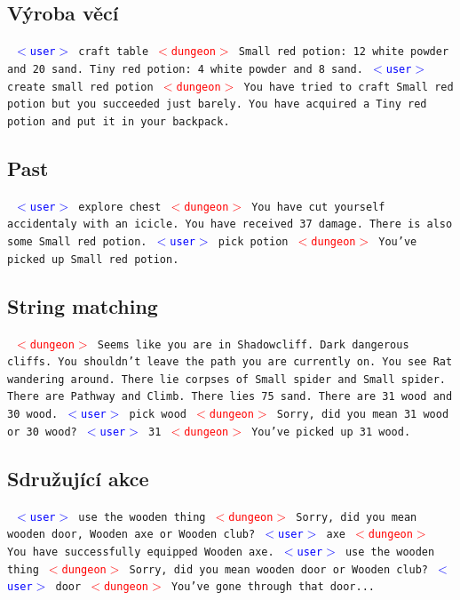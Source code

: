 \documentclass[11pt, a4paper]{article}
\newenvironment{example}%
{\smallskip\noindent\ignorespaces\obeylines\tt}%
{\smallskip\par\noindent
\ignorespacesafterend}
\def\user{\textcolor{blue}{$<$user$>$ }}
\def\dung{\textcolor{red}{$<$dungeon$>$ }}
\begin{document}
\subsection{Výroba věcí}
\begin{example}
\user craft table
\dung Small red potion: 12 white powder and 20 sand. Tiny red potion: 4 white powder and 8 sand.
\user create small red potion
\dung You have tried to craft Small red potion but you succeeded just barely. You have acquired a Tiny red potion and put it in your backpack.
\end{example}
\subsection{Past}
\begin{example}
\user explore chest
\dung You have cut yourself accidentaly with an icicle. You have received 37 damage. There is also some Small red potion.
\user pick potion
\dung You've picked up Small red potion.
\end{example}
\subsection{String matching}
\begin{example}
\dung Seems like you are in Shadowcliff. Dark dangerous cliffs. You shouldn't leave the path you are currently on. You see Rat wandering around. There lie corpses of Small spider and Small spider. There are Pathway and Climb. There lies 75 sand. There are 31 wood and 30 wood.
\user pick wood
\dung Sorry, did you mean 31 wood or 30 wood?
\user 31
\dung You've picked up 31 wood.
\end{example}

\subsection{Sdružující akce}
\begin{example}
\user use the wooden thing
\dung Sorry, did you mean wooden door, Wooden axe or Wooden club?
\user axe
\dung You have successfully equipped Wooden axe.
\user use the wooden thing
\dung Sorry, did you mean wooden door or Wooden club?
\user door
\dung You've gone through that door...
\end{example}
\end{document}
